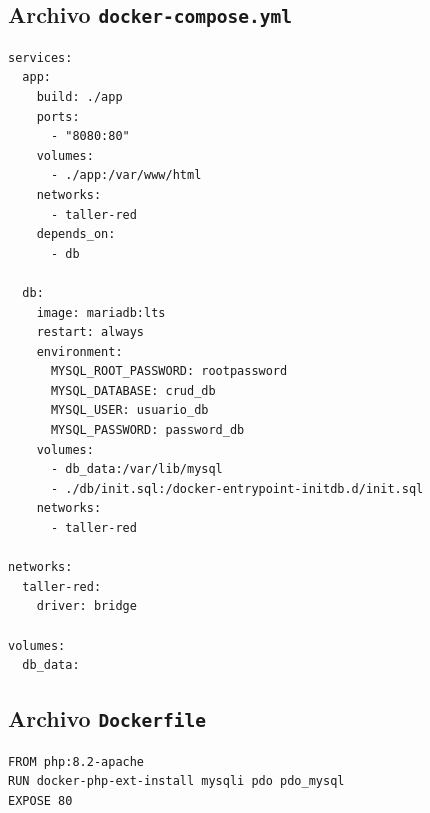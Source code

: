 \subsection{Archivo \texttt{docker-compose.yml}}
\begin{lstlisting}[frame=single, breaklines=true, basicstyle=\ttfamily\footnotesize]
services:
  app:
    build: ./app
    ports:
      - "8080:80"
    volumes:
      - ./app:/var/www/html
    networks:
      - taller-red
    depends_on:
      - db

  db:
    image: mariadb:lts
    restart: always
    environment:
      MYSQL_ROOT_PASSWORD: rootpassword
      MYSQL_DATABASE: crud_db
      MYSQL_USER: usuario_db
      MYSQL_PASSWORD: password_db
    volumes:
      - db_data:/var/lib/mysql
      - ./db/init.sql:/docker-entrypoint-initdb.d/init.sql
    networks:
      - taller-red

networks:
  taller-red:
    driver: bridge

volumes:
  db_data:
\end{lstlisting}

\subsection{Archivo \texttt{Dockerfile}}
\begin{lstlisting}[frame=single, breaklines=true, basicstyle=\ttfamily\footnotesize]
FROM php:8.2-apache
RUN docker-php-ext-install mysqli pdo pdo_mysql
EXPOSE 80
\end{lstlisting}